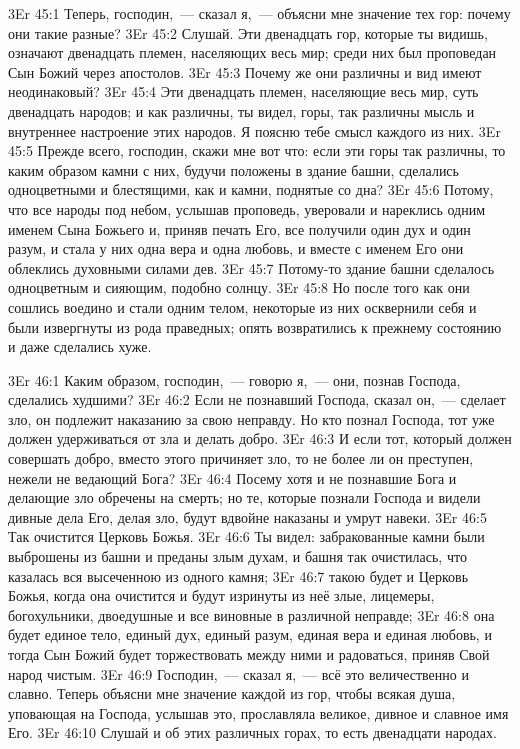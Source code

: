 \vs 3Er 45:1
Теперь, господин,~--- сказал
я,~--- объясни мне значение тех гор: почему они такие разные?
\vs 3Er 45:2
Слушай. Эти двенадцать
гор, которые ты видишь, означают двенадцать племен, населяющих весь мир; среди
них был проповедан Сын Божий через апостолов.
\vs 3Er 45:3
Почему же они различны и
вид имеют неодинаковый?
\vs 3Er 45:4
Эти двенадцать племен,
населяющие весь мир, суть двенадцать народов; и как различны, ты видел, горы,
так различны мысль и внутреннее настроение этих народов. Я поясню тебе смысл
каждого из них.
\vs 3Er 45:5
Прежде всего, господин,
скажи мне вот что: если эти горы так различны, то каким образом камни с них,
будучи положены в здание башни, сделались одноцветными и блестящими, как и
камни, поднятые со дна?
\vs 3Er 45:6
Потому, что все народы под
небом, услышав проповедь, уверовали и нареклись одним именем Сына Божьего и,
приняв печать Его, все получили один дух и один разум, и стала у них одна вера
и одна любовь, и вместе с именем Его они облеклись духовными силами дев.
\vs 3Er 45:7
Потому-то здание башни
сделалось одноцветным и сияющим, подобно солнцу.
\vs 3Er 45:8
Но после того как они
сошлись воедино и стали одним телом, некоторые из них осквернили себя и были
извергнуты из рода праведных; опять возвратились к прежнему состоянию и даже
сделались хуже.

\vs 3Er 46:1
Каким образом, господин,~--- говорю я,~--- они, познав Господа, сделались худшими?
\vs 3Er 46:2
Если не познавший Господа,
сказал он,~--- сделает зло, он подлежит наказанию за свою неправду. Но кто
познал Господа, тот уже должен удерживаться от зла и делать добро.
\vs 3Er 46:3
И если тот, который должен
совершать добро, вместо этого причиняет зло, то не более ли он преступен,
нежели не ведающий Бога?
\vs 3Er 46:4
Посему хотя и не познавшие
Бога и делающие зло обречены на смерть; но те, которые познали Господа и
видели дивные дела Его, делая зло, будут вдвойне наказаны и умрут навеки.
\vs 3Er 46:5
Так очистится Церковь
Божья.
\vs 3Er 46:6
Ты видел: забракованные
камни были выброшены из башни и преданы злым духам, и башня так очистилась,
что казалась вся высеченною из одного камня;
\vs 3Er 46:7
такою будет и Церковь
Божья, когда она очистится и будут изринуты из неё злые, лицемеры,
богохульники, двоедушные и все виновные в различной неправде;
\vs 3Er 46:8
она будет единое тело,
единый дух, единый разум, единая вера и единая любовь, и тогда Сын Божий будет
торжествовать между ними и радоваться, приняв Свой народ чистым.
\vs 3Er 46:9
Господин,~--- сказал я,~--- всё это величественно и славно. Теперь объясни мне значение каждой из гор,
чтобы всякая душа, уповающая на Господа, услышав это, прославляла великое,
дивное и славное имя Его.
\vs 3Er 46:10
Слушай и об этих
различных горах, то есть двенадцати народах.

